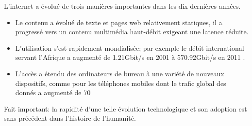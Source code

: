 
 


L'internet a évolué de trois manières importantes dans les dix dernières années. 
\begin{itemize}
\item Le contenu a évolué de texte et pages web relativement statiques, il a progressé vers un contenu multimédia haut-débit exigeant une latence réduite. 
\item L'utilisation s'est rapidement mondialisée; par exemple le débit international servant l'Afrique a augmenté de 1.21Gbit/s en 2001 à 570.92Gbit/s en 2011 \cite{InternetGlobalGrowth}.
\item  L'accès a étendu des ordinateurs de bureau à une variété de nouveaux dispositifs, comme pour les téléphones mobiles dont le trafic global des donnés a augmenté de 70%
\end{itemize}
Fait important: la rapidité d'une telle évolution technologique et son adoption est sans précédent dans l'histoire de l'humanité. 



